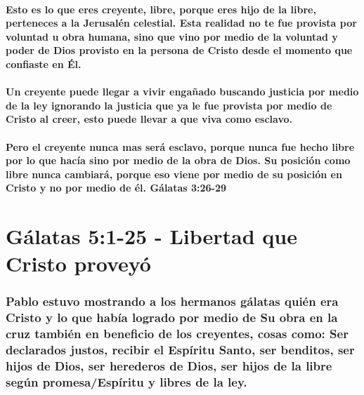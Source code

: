 \documentclass[11a pt,twoside]{article}
\let\oldsection\section
\renewcommand{\section}{\needspace{6\baselineskip}\oldsection}
\let\oldsubsubsection\subsubsection
\renewcommand{\subsubsection}{\needspace{4\baselineskip}\oldsubsubsection}
\let\oldparagraph\paragraph
\renewcommand{\paragraph}{\needspace{3\baselineskip}\oldparagraph}
\begin{document}
\paragraph{Esto es lo que eres creyente, libre, porque eres hijo de la
libre, perteneces a la Jerusalén celestial. Esta realidad no te fue
provista por voluntad u obra humana, sino que vino por medio de la
voluntad y poder de Dios provisto en la persona de Cristo desde el
momento que confiaste en
Él.}\label{esto-es-lo-que-eres-creyente-libre-porque-eres-hijo-de-la-libre-perteneces-a-la-jerusaluxe9n-celestial.-esta-realidad-no-te-fue-provista-por-voluntad-u-obra-humana-sino-que-vino-por-medio-de-la-voluntad-y-poder-de-dios-provisto-en-la-persona-de-cristo-desde-el-momento-que-confiaste-en-uxe9l.}

\paragraph{Un creyente puede llegar a vivir engañado buscando justicia
por medio de la ley ignorando la justicia que ya le fue provista por
medio de Cristo al creer, esto puede llevar a que viva como
esclavo.}\label{un-creyente-puede-llegar-a-vivir-engauxf1ado-buscando-justicia-por-medio-de-la-ley-ignorando-la-justicia-que-ya-le-fue-provista-por-medio-de-cristo-al-creer-esto-puede-llevar-a-que-viva-como-esclavo.}

\paragraph{Pero el creyente nunca mas será esclavo, porque nunca fue
hecho libre por lo que hacía sino por medio de la obra de Dios. Su
posición como libre nunca cambiará, porque eso viene por medio de su
posición en Cristo y no por medio de él. Gálatas
3:26-29}\label{pero-el-creyente-nunca-mas-seruxe1-esclavo-porque-nunca-fue-hecho-libre-por-lo-que-hacuxeda-sino-por-medio-de-la-obra-de-dios.-su-posiciuxf3n-como-libre-nunca-cambiaruxe1-porque-eso-viene-por-medio-de-su-posiciuxf3n-en-cristo-y-no-por-medio-de-uxe9l.-guxe1latas-326-29}

\section{Gálatas 5:1-25 - Libertad que Cristo
proveyó}\label{guxe1latas-51-25---libertad-que-cristo-proveyuxf3}

\subsubsection{Pablo estuvo mostrando a los hermanos gálatas quién era
Cristo y lo que había logrado por medio de Su obra en la cruz también en
beneficio de los creyentes, cosas como: Ser declarados justos, recibir
el Espíritu Santo, ser benditos, ser hijos de Dios, ser herederos de
Dios, ser hijos de la libre según promesa/Espíritu y libres de la
ley.}\label{pablo-estuvo-mostrando-a-los-hermanos-guxe1latas-quiuxe9n-era-cristo-y-lo-que-habuxeda-logrado-por-medio-de-su-obra-en-la-cruz-tambiuxe9n-en-beneficio-de-los-creyentes-cosas-como-ser-declarados-justos-recibir-el-espuxedritu-santo-ser-benditos-ser-hijos-de-dios-ser-herederos-de-dios-ser-hijos-de-la-libre-seguxfan-promesaespuxedritu-y-libres-de-la-ley.}
\end{document}
